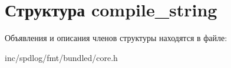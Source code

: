 \hypertarget{structcompile__string}{}\section{Структура compile\+\_\+string}
\label{structcompile__string}


Объявления и описания членов структуры находятся в файле\+:\begin{DoxyCompactItemize}
\item 
inc/spdlog/fmt/bundled/core.\+h\end{DoxyCompactItemize}
